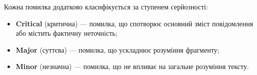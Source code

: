 Кожна помилка додатково класифікується за ступенем серйозності:
\begin{itemize}[nosep]
    \item \textbf{Critical} (критична) --- помилка, що спотворює основний зміст
    повідомлення або містить фактичну неточність;
    \item \textbf{Major} (суттєва) --- помилка, що ускладнює розуміння фрагменту;
    \item \textbf{Minor} (незначна) --- помилка, що не впливає на загальне
    розуміння тексту.
\end{itemize}
